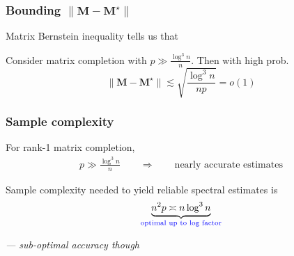 \documentclass[compress,
mathserif,wide,%
]{beamer}
\begin{document}
\begin{frame}
	\frametitle{Bounding $\|\bm{M} - \bm{M}^\star\|$}
Matrix Bernstein inequality tells us that 
%
\begin{lemma}
\label{lem:perturbation-SBM}
%
Consider matrix completion with $p \gg \frac{\log^{3} n}{n}$. Then with high prob. 
%
\begin{equation}
	\label{eq:MC-perturbation}
	\|\bm{M}-\bm{M}^{\star}\|\lesssim {\sqrt{\frac{\log^{3} n }{np}}} = o(1)
\end{equation}
%
\end{lemma}

	
\end{frame}



\begin{frame}
\frametitle{Sample complexity}

For rank-1 matrix completion, 
%
\begin{align*}
	p\gg \frac{\log^{3}n}{n}  \qquad \Longrightarrow \qquad \text{nearly accurate estimates}
\end{align*}


\vfill

Sample complexity needed to yield reliable spectral estimates is 
%
\[
	\underset{\textcolor{blue}{ \text{optimal up to log factor}}}{\underbrace{ n^2 p \asymp n \log ^3 n  }} 
\]
%


\vfill 

{\hfill \em \footnotesize --- sub-optimal accuracy though}

\end{frame}
\end{document}
